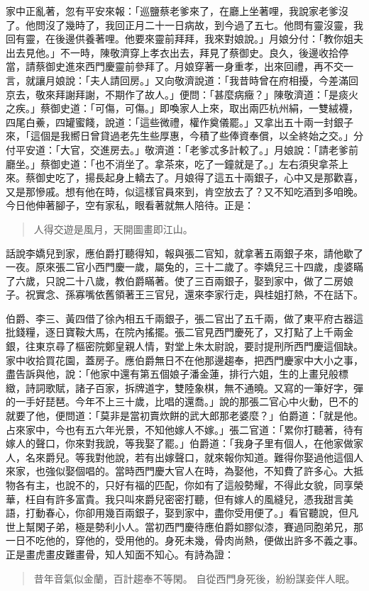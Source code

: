 家中正亂著，忽有平安來報：「巡鹽蔡老爹來了，在廳上坐著哩，我說家老爹沒了。他問沒了幾時了，我回正月二十一日病故，到今過了五七。他問有靈沒靈，我回有靈，在後邊供養著哩。他要來靈前拜拜，我來對娘說。」月娘分付：「教你姐夫出去見他。」不一時，陳敬濟穿上孝衣出去，拜見了蔡御史。良久，後邊收拾停當，請蔡御史進來西門慶靈前參拜了。月娘穿著一身重孝，出來回禮，再不交一言，就讓月娘說：「夫人請回房。」又向敬濟說道：「我昔時曾在府相擾，今差滿回京去，敬來拜謝拜謝，不期作了故人。」便問：「甚麼病癥？」陳敬濟道：「是痰火之疾。」蔡御史道：「可傷，可傷。」即喚家人上來，取出兩匹杭州絹，一雙絨襪，四尾白鯗，四罐蜜餞，說道：「這些微禮，權作奠儀罷。」又拿出五十兩一封銀子來，「這個是我嚮日曾貸過老先生些厚惠，今積了些俸資奉償，以全終始之交。」分付平安道：「大官，交進房去。」敬濟道：「老爹忒多計較了。」月娘說：「請老爹前廳坐。」蔡御史道：「也不消坐了。拿茶來，吃了一鐘就是了。」左右須臾拿茶上來。蔡御史吃了，揚長起身上轎去了。月娘得了這五十兩銀子，心中又是那歡喜，又是那慘戚。想有他在時，似這樣官員來到，肯空放去了？又不知吃酒到多咱晚。今日他伸著腳子，空有家私，眼看著就無人陪待。正是：
\begin{quote}
人得交遊是風月，天開圖畫即江山。
\end{quote}

話說李嬌兒到家，應伯爵打聽得知，報與張二官知，就拿著五兩銀子來，請他歇了一夜。原來張二官小西門慶一歲，屬兔的，三十二歲了。李嬌兒三十四歲，虔婆瞞了六歲，只說二十八歲，教伯爵瞞著。使了三百兩銀子，娶到家中，做了二房娘子。祝實念、孫寡嘴依舊領著王三官兒，還來李家行走，與桂姐打熱，不在話下。

伯爵、李三、黃四借了徐內相五千兩銀子，張二官出了五千兩，做了東平府古器這批錢糧，逐日寶鞍大馬，在院內搖擺。張二官見西門慶死了，又打點了上千兩金銀，往東京尋了樞密院鄭皇親人情，對堂上朱太尉說，要討提刑所西門慶這個缺。家中收拾買花園，蓋房子。應伯爵無日不在他那邊趨奉，把西門慶家中大小之事，盡告訴與他，說：「他家中還有第五個娘子潘金蓮，排行六姐，生的上畫兒般標緻，詩詞歌賦，諸子百家，拆牌道字，雙陸象棋，無不通曉。又寫的一筆好字，彈的一手好琵琶。今年不上三十歲，比唱的還喬。」說的那張二官心中火動，巴不的就要了他，便問道：「莫非是當初賣炊餅的武大郎那老婆麼？」伯爵道：「就是他。占來家中，今也有五六年光景，不知他嫁人不嫁。」張二官道：「累你打聽著，待有嫁人的聲口，你來對我說，等我娶了罷。」伯爵道：「我身子里有個人，在他家做家人，名來爵兒。等我對他說，若有出嫁聲口，就來報你知道。難得你娶過他這個人來家，也強似娶個唱的。當時西門慶大官人在時，為娶他，不知費了許多心。大抵物各有主，也說不的，只好有福的匹配，你如有了這般勢耀，不得此女貌，同享榮華，枉自有許多富貴。我只叫來爵兒密密打聽，但有嫁人的風縫兒，憑我甜言美語，打動春心，你卻用幾百兩銀子，娶到家中，盡你受用便了。」看官聽說，但凡世上幫閑子弟，極是勢利小人。當初西門慶待應伯爵如膠似漆，賽過同胞弟兄，那一日不吃他的，穿他的，受用他的。身死未幾，骨肉尚熱，便做出許多不義之事。正是畫虎畫皮難畫骨，知人知面不知心。有詩為證：
\begin{quote}
昔年音氣似金蘭，百計趨奉不等閑。
自從西門身死後，紛紛謀妾伴人眠。
\end{quote}
